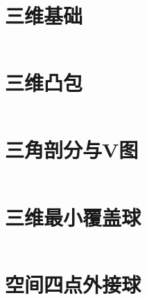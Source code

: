 \section{三维基础}
\inputminted{cpp}{\source/computational-geometry/3DGeo.cpp}
\section{三维凸包}
\inputminted{cpp}{\source/computational-geometry/3DConvex.cpp}
\section{三角剖分与V图}
\inputminted{cpp}{\source/computational-geometry/DelaunayTriangulation.cpp}
\section{三维最小覆盖球}
\inputminted{cpp}{\source/computational-geometry/minimum-coverage-ball.cpp}
\section{空间四点外接球}
\inputminted{cpp}{\source/computational-geometry/min_ball.cpp}
